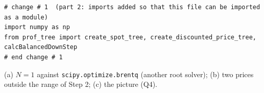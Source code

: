 \documentclass[11pt,a4paper]{article}
\newcommand{\subhead}[1]{\par\medskip\noindent{\large\bfseries #1}\par\smallskip\noindent\ignorespaces}
\begin{document}
\par\smallskip\noindent\begin{minipage}{\linewidth}\begin{lstlisting}[style=py,title={change in \texttt{bg\_functions.py} (top of the file; the rest is the code of part 1)}]
# change # 1  (part 2: imports added so that this file can be imported as a module)
import numpy as np
from prof_tree import create_spot_tree, create_discounted_price_tree, calcBalancedDownStep
# end change # 1
\end{lstlisting}\end{minipage}\par\smallskip

\subhead{Q1 --- test.} (a) $N=1$ against \texttt{scipy.optimize.brentq} (another root solver); (b) two prices outside the range of Step 2; (c) the picture (Q4).
\end{document}
